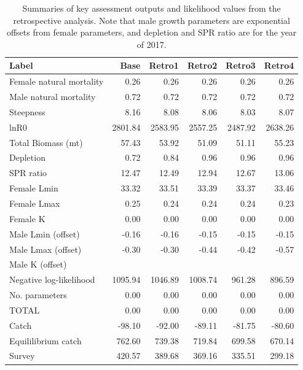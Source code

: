 \documentclass[12pt,]{article}
\begin{document}
\begin{landscape}
\begin{table}[ht]
\centering
\caption{Summaries of key assessment outputs 
                                              and likelihood values from the retrospective 
                                              analysis.  Note that male 
                                              growth parameters are exponential 
                                              offsets from female parameters, and 
                                              depletion and SPR ratio are for the year of 2017.} 
\label{tab:retro}
\begin{tabular}{lrrrrr}
  \hline
Label & Base & Retro1 & Retro2 & Retro3 & Retro4 \\ 
  \hline
Female natural mortality & 0.26 & 0.26 & 0.26 & 0.26 & 0.26 \\ 
  Male natural mortality & 0.72 & 0.72 & 0.72 & 0.72 & 0.72 \\ 
  Steepness & 8.16 & 8.08 & 8.06 & 8.03 & 8.07 \\ 
  lnR0 & 2801.84 & 2583.95 & 2557.25 & 2487.92 & 2638.26 \\ 
  Total Biomass (mt) & 57.43 & 53.92 & 51.09 & 51.11 & 55.23 \\ 
  Depletion & 0.72 & 0.84 & 0.96 & 0.96 & 0.96 \\ 
  SPR ratio & 12.47 & 12.49 & 12.94 & 12.67 & 13.06 \\ 
  Female Lmin & 33.32 & 33.51 & 33.39 & 33.37 & 33.46 \\ 
  Female Lmax & 0.25 & 0.24 & 0.24 & 0.24 & 0.23 \\ 
  Female K & 0.00 & 0.00 & 0.00 & 0.00 & 0.00 \\ 
  Male Lmin (offset) & -0.16 & -0.16 & -0.15 & -0.15 & -0.15 \\ 
  Male Lmax (offset) & -0.30 & -0.30 & -0.44 & -0.42 & -0.57 \\ 
  Male K (offset) &  &  &  &  &  \\ 
  Negative log-likelihood & 1095.94 & 1046.89 & 1008.74 & 961.28 & 896.59 \\ 
  No. parameters & 0.00 & 0.00 & 0.00 & 0.00 & 0.00 \\ 
  TOTAL & 0.00 & 0.00 & 0.00 & 0.00 & 0.00 \\ 
  Catch & -98.10 & -92.00 & -89.11 & -81.75 & -80.60 \\ 
  Equililibrium catch & 762.60 & 739.38 & 719.84 & 699.58 & 670.14 \\ 
  Survey & 420.57 & 389.68 & 369.16 & 335.51 & 299.18 \\ 

\end{tabular}
\end{table}
\end{landscape}
\end{document}
